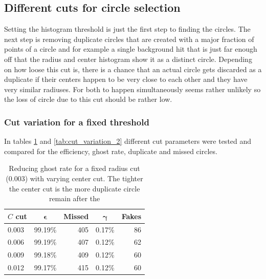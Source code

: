 \documentclass[11pt,twoside]{scrreprt}
\begin{document}

\subsection{Different cuts for circle selection} %
\label{sub:different_cuts_for_circle_selection}
Setting the histogram threshold is just the first step to finding the circles. The next step is removing duplicate circles that
are created with a major fraction of points of a circle and for example a single background hit that is just far enough off
that the radius and center histogram show it as a distinct circle. Depending on how loose this cut is, there is a chance that an actual
circle gets discarded as a duplicate if their centers happen to be very close to each other and they have very similar radiuses. For
both to happen simultaneously seems rather unlikely so the loss of circle due to this cut should be rather low.

\subsubsection{Cut variation for a fixed threshold} %
In tables \ref{tab:cut_variation_1} and \ref{tab:cut_variation_2} different cut parameters were tested
and compared for the efficiency, ghost rate, duplicate and missed circles.

\label{ssub:cut_variation_for_a_fixed_threshold}
\begin{table}[htbp]
  \caption{Reducing ghost rate for a fixed radius cut (0.003) with varying center cut. The tighter the center cut is
  the more duplicate circle remain after the }
  \label{tab:cut_variation_1}
  \centering

  \begin{tabular}{lcrcr}
  \toprule
  \textbf{$C$ cut} & $\boldsymbol{\epsilon}$ & \textbf{Missed} & $\boldsymbol{\gamma}$ & \textbf{Fakes} \\
  \midrule
  0.003 & 99.19\% & 405 & 0.17\% & 86 \\
  0.006 & 99.19\% & 407 & 0.12\% & 62 \\
  0.009 & 99.18\% & 409 & 0.12\% & 60 \\
  0.012 & 99.17\% & 415 & 0.12\% & 60 \\
    \bottomrule
  \end{tabular}
\end{table}
\end{document}
